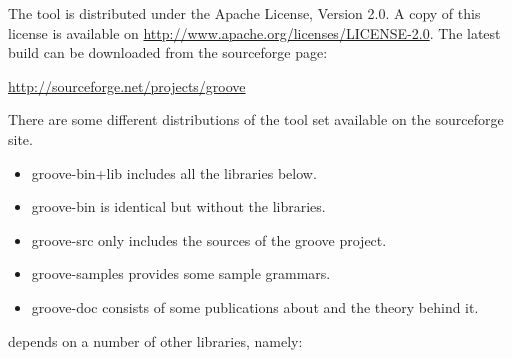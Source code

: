 The \GROOVE tool is distributed under the Apache License, Version 2.0. A copy of
this license is available on \url{http://www.apache.org/licenses/LICENSE-2.0}.
The latest \GROOVE build can be downloaded from the \GROOVE sourceforge page:

\begin{center}
\url{http://sourceforge.net/projects/groove}
\end{center}

There are some different distributions of the \GROOVE tool set available on the
sourceforge site. 
\begin{itemize}[noitemsep]
\item \textsf{groove-bin+lib} includes all the libraries
below.
\item \textsf{groove-bin} is identical but without the libraries.
\item \textsf{groove-src} only includes the sources of the groove project.
\item \textsf{groove-samples} provides some sample grammars.
\item \textsf{groove-doc} consists of some publications about \GROOVE and
the theory behind it.
\end{itemize}
%
\GROOVE depends on a number of other libraries, namely:

\DTLsetseparator{;}


